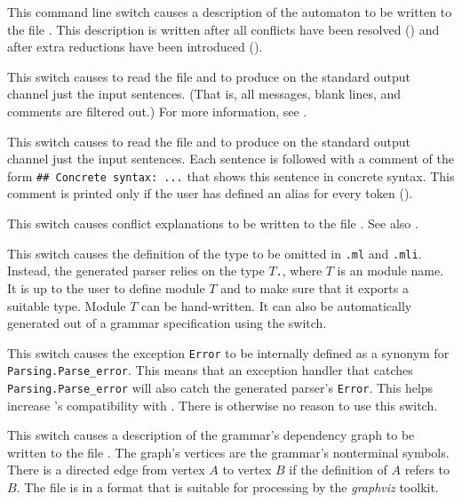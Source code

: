 \documentclass[onecolumn,11pt,nocopyrightspace,preprint]{sigplanconf}
\begin{document}
\docswitch{\odumpresolved} This command line switch causes a description of
the automaton to be written to the file \automatonresolved. This
description is written after all conflicts have been resolved
() and after extra reductions have been introduced
().

 This switch causes \menhir to
read the \messages file  and to produce on the standard output
channel just the input sentences. (That is, all messages, blank lines, and
comments are filtered out.) For more information, see .

 This switch causes \menhir to
read the \messages file  and to produce on the standard output
channel just the input sentences. Each sentence is followed with a comment of
the form \verb+## Concrete syntax: ...+ that shows this sentence in concrete
syntax. This comment is printed only if the user has defined an alias for
every token ().

\docswitch{\oexplain} This switch causes conflict explanations to be
written  to the file \conflicts. See also .

 This switch causes the definition of
the \token type to be omitted in \texttt{.ml} and
\texttt{.mli}. Instead, the generated parser relies on
the type $T$\texttt{.}\token, where $T$ is an \ocaml module name. It is up to
the user to define module $T$ and to make sure that it exports a suitable
\token type. Module $T$ can be hand-written. It can also be automatically generated
out of a grammar specification using the \oonlytokens switch.

\docswitch{\ofixedexc} This switch causes the exception \texttt{Error} to be
internally defined as a synonym for \texttt{Parsing.Parse\_error}. This means
that an exception handler that catches \texttt{Parsing.Parse\_error} will also
catch the generated parser's \texttt{Error}. This helps increase \menhir's
compatibility with \ocamlyacc. There is otherwise no reason to use this switch.

\docswitch{\ograph} This switch causes a description of the grammar's
dependency graph to be written to the file \dott. The graph's
vertices are the grammar's nonterminal symbols. There is a directed edge from
vertex $A$ to vertex $B$ if the definition of $A$ refers to $B$. The file is
in a format that is suitable for processing by the \emph{graphviz} toolkit.
\end{document}
